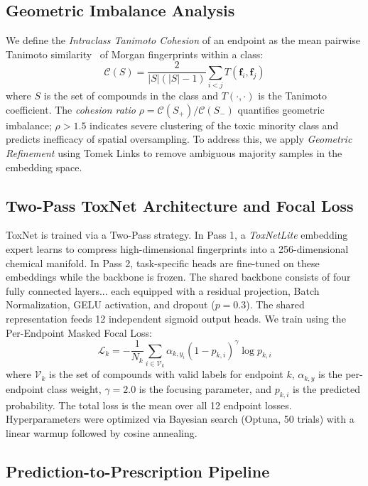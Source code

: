 \documentclass[lettersize,journal]{IEEEtran}
\begin{document}
\subsection{Geometric Imbalance Analysis}
We define the \textit{Intraclass Tanimoto Cohesion} of an endpoint as the mean
pairwise Tanimoto similarity~\cite{rogers2010} of Morgan fingerprints within
a class:
\begin{equation}
  \mathcal{C}(S) = \frac{2}{|S|(|S|-1)} \sum_{i<j} T(\mathbf{f}_i, \mathbf{f}_j)
  \label{eq:cohesion}
\end{equation}
where $S$ is the set of compounds in the class and $T(\cdot,\cdot)$ is the
Tanimoto coefficient.
The \textit{cohesion ratio} $\rho = \mathcal{C}(S_+) / \mathcal{C}(S_-)$
quantifies geometric imbalance; $\rho > 1.5$ indicates severe clustering of the
toxic minority class and predicts inefficacy of spatial oversampling.
To address this, we apply \textit{Geometric Refinement} using Tomek Links
\cite{tomek1976} to remove ambiguous majority samples in the embedding space.

\subsection{Two-Pass ToxNet Architecture and Focal Loss}
ToxNet is trained via a Two-Pass strategy. In Pass 1, a \textit{ToxNetLite}
embedding expert learns to compress high-dimensional fingerprints into a
256-dimensional chemical manifold.
In Pass 2, task-specific heads are fine-tuned on these embeddings while the
backbone is frozen.
The shared backbone consists of four fully connected layers...
each equipped with a residual projection, Batch Normalization, GELU activation,
and dropout ($p=0.3$).
The shared representation feeds 12 independent sigmoid output heads.
We train using the Per-Endpoint Masked Focal Loss:
\begin{equation}
  \mathcal{L}_k = -\frac{1}{N_k}\sum_{i \in \mathcal{V}_k}
    \alpha_{k,y_i}(1-p_{k,i})^{\gamma} \log p_{k,i}
  \label{eq:focal}
\end{equation}
where $\mathcal{V}_k$ is the set of compounds with valid labels for endpoint $k$,
$\alpha_{k,y}$ is the per-endpoint class weight, $\gamma=2.0$ is the focusing
parameter, and $p_{k,i}$ is the predicted probability.
The total loss is the mean over all 12 endpoint losses.
Hyperparameters were optimized via Bayesian search (Optuna, 50 trials) with a
linear warmup followed by cosine annealing.

\subsection{Prediction-to-Prescription Pipeline}
\end{document}
